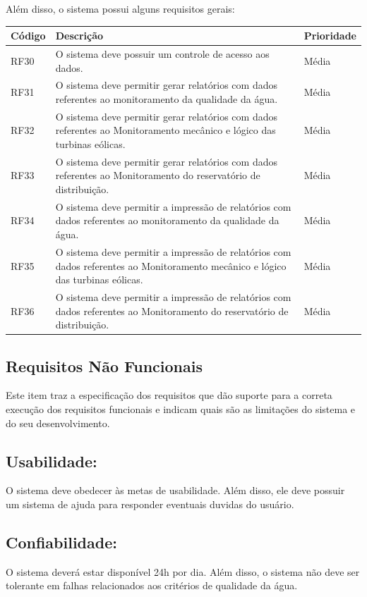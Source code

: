  Além disso, o sistema possui alguns requisitos gerais:
  
    \begin{longtable}{|m{3.0cm}|m{7.5cm}|m{3.5cm}|}
      \hline
\textbf{Código} & \textbf{Descrição} & \textbf{Prioridade}\\
\hline
RF30 & O sistema deve possuir um controle de acesso aos dados. & Média\\
\hline
RF31 & O sistema deve permitir gerar relatórios com dados referentes ao monitoramento da qualidade da água. & Média\\
\hline
RF32 & O sistema deve permitir gerar relatórios com dados referentes ao Monitoramento mecânico e lógico das turbinas eólicas. & Média\\
\hline
RF33 & O sistema deve permitir gerar relatórios com dados referentes ao Monitoramento do reservatório de distribuição. & Média\\
\hline
RF34 & O sistema deve permitir a impressão de relatórios com dados referentes ao monitoramento da qualidade da água. & Média\\
\hline
RF35 & O sistema deve permitir a impressão de relatórios com dados referentes ao Monitoramento mecânico e lógico das turbinas eólicas. & Média\\
\hline
RF36 & O  sistema deve permitir a impressão de relatórios com dados referentes ao Monitoramento do reservatório de distribuição. & Média\\
\hline

  \end{longtable}
  
  \subsection{Requisitos Não Funcionais}
  Este item traz a especificação dos requisitos que dão suporte para a correta execução dos requisitos funcionais e indicam quais são as limitações 
  do sistema e do seu desenvolvimento.
  
  \subsection{Usabilidade:}
  O sistema deve obedecer às metas de usabilidade. Além disso, ele deve possuir um sistema de ajuda para responder eventuais duvidas do usuário.
  
  \subsection{Confiabilidade:}
  O sistema deverá estar disponível 24h por dia. Além disso, o sistema não deve ser tolerante em falhas relacionados aos critérios de qualidade da água.

